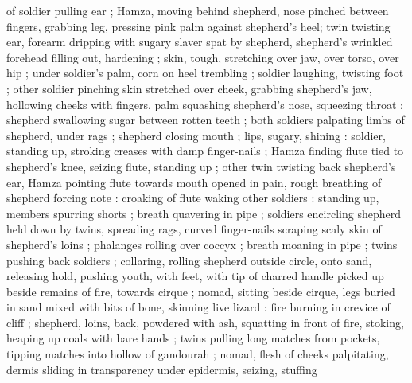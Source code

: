 of soldier pulling ear{\td}  ; Hamza, moving behind shepherd, nose pinched between fingers, grabbing leg, pressing pink palm against shepherd's heel; twin twisting ear, forearm dripping with sugary slaver spat by shepherd, shepherd's wrinkled forehead filling out, hardening ; skin, tough, stretching over jaw, over torso, over hip ; under soldier's palm, corn on heel trembling ; soldier laughing, twisting foot ; other soldier pinching skin stretched over cheek, grabbing shepherd's jaw, hollowing cheeks with fingers, palm squashing shepherd's nose, squeezing throat : shepherd swallowing sugar between rotten teeth ; both soldiers palpating limbs of shepherd, under rags ; shepherd closing mouth ; lips, sugary, shining : soldier, standing up, stroking creases with damp finger-nails{\td}  ; Hamza finding flute tied to shepherd's knee, seizing flute, standing up ; other twin twisting back shepherd's ear, Hamza pointing flute towards mouth opened in pain, rough breathing of shepherd forcing note : croaking of flute waking other soldiers : standing up, members spurring shorts ; breath quavering in pipe ; soldiers encircling shepherd held down by twins, spreading rags, curved finger-nails scraping scaly skin of shepherd's loins ; phalanges rolling over coccyx ; breath moaning in pipe ; twins pushing back soldiers ; collaring, rolling shepherd outside circle, onto sand, releasing hold, pushing youth, with feet, with tip of charred handle picked up beside remains of fire, towards cirque ; nomad, sitting beside cirque, legs buried in sand mixed with bits of bone, skinning live lizard : fire burning in crevice of cliff ; shepherd, loins, back, powdered with ash, squatting in front of fire, stoking, heaping up coals with bare hands ; twins pulling long matches from pockets, tipping matches into hollow of gandourah  ; nomad, flesh of cheeks palpitating, dermis sliding in transparency under epidermis, seizing, stuffing 
